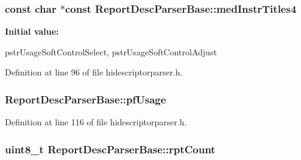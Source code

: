 \hypertarget{class_report_desc_parser_base_abf57eb862e09967eb05a234f81b4a9d4}{
\subsubsection[{med\-Instr\-Titles4}]{\setlength{\rightskip}{0pt plus 5cm}const char $\ast$const {\bf \-Report\-Desc\-Parser\-Base\-::med\-Instr\-Titles4}}}\label{class_report_desc_parser_base_abf57eb862e09967eb05a234f81b4a9d4}
{\bfseries \-Initial value\-:}
\begin{DoxyCode}
 {
        pstrUsageSoftControlSelect,
        pstrUsageSoftControlAdjust
}
\end{DoxyCode}


\-Definition at line 96 of file hidescriptorparser.\-h.

\hypertarget{class_report_desc_parser_base_a22006cbf92a3d4008695e53d7f6e2452}{
\subsubsection[{pf\-Usage}]{ {\bf \-Report\-Desc\-Parser\-Base\-::pf\-Usage}}}\label{class_report_desc_parser_base_a22006cbf92a3d4008695e53d7f6e2452}


\-Definition at line 116 of file hidescriptorparser.\-h.

\hypertarget{class_report_desc_parser_base_a2c15a93cace44e39560e4613bbefaf14}{
\subsubsection[{rpt\-Count}]{\setlength{\rightskip}{0pt plus 5cm}uint8\-\_\-t {\bf \-Report\-Desc\-Parser\-Base\-::rpt\-Count}}}\label{class_report_desc_parser_base_a2c15a93cace44e39560e4613bbefaf14}


